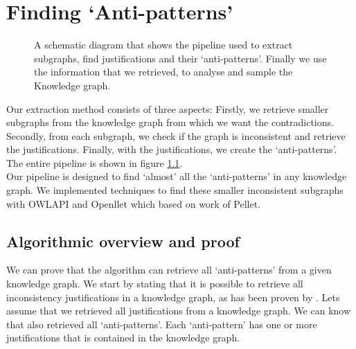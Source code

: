 \documentclass[11pt,letterpaper ,oneside ]{book}
\begin{document}
\chapter{Finding `Anti-patterns'}\label{Method}
\begin{figure}[!t]
	\centering
	\caption{A schematic diagram that shows the pipeline used to extract subgraphs, find justifications and their `anti-patterns'. Finally 
		we use the information that we retrieved, to analyse and sample the Knowledge graph.}
	\label{fig:simplePipeline}
\end{figure}
Our extraction method consists of three aspects: Firstly, we retrieve smaller subgraphs from the knowledge graph from which we want the contradictions. Secondly, from each subgraph, we check if the graph is inconsistent and retrieve the justifications. Finally, with the justifications, we create the `anti-patterns'. The entire pipeline is shown in figure \ref{fig:simplePipeline}.\\
Our pipeline is designed to find `almost' all the `anti-patterns' in any knowledge graph. We implemented techniques to find these smaller inconsistent subgraphs with OWLAPI\cite{Horridge:2011} and Openllet\cite{Openllet:2019} which based on work of Pellet\cite{Pellet:2007}.\\

\section{Algorithmic overview and proof}
We can prove that the algorithm can retrieve all `anti-patterns' from a given knowledge graph. We start by stating that it is possible to retrieve all inconsistency justifications in a knowledge graph, as has been proven by \cite{Horridge:2009}. Lets assume that we retrieved all justifications from a knowledge graph. We can know that also retrieved all `anti-patterns'. Each `anti-pattern' has one or more justifications that is contained in the knowledge graph. \\
\end{document}
